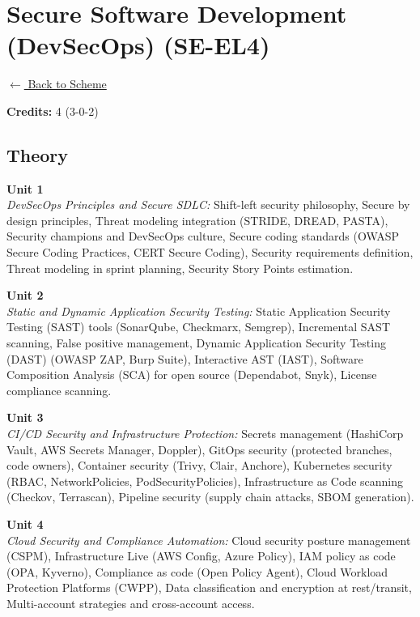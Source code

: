 \section*{Secure Software Development (DevSecOps) (SE-EL4)}
\label{elec:SE_4}

\noindent \small{\hyperref[main:scheme]{$\leftarrow$ Back to Scheme}} \vspace{0.5cm}

\noindent \textbf{Credits:} 4 (3-0-2)

\subsection*{Theory}
\noindent\textbf{Unit 1} \\
\textit{DevSecOps Principles and Secure SDLC:} Shift-left security philosophy, Secure by design principles, Threat modeling integration (STRIDE, DREAD, PASTA), Security champions and DevSecOps culture, Secure coding standards (OWASP Secure Coding Practices, CERT Secure Coding), Security requirements definition, Threat modeling in sprint planning, Security Story Points estimation.

\vspace{0.3cm}

\noindent\textbf{Unit 2} \\
\textit{Static and Dynamic Application Security Testing:} Static Application Security Testing (SAST) tools (SonarQube, Checkmarx, Semgrep), Incremental SAST scanning, False positive management, Dynamic Application Security Testing (DAST) (OWASP ZAP, Burp Suite), Interactive AST (IAST), Software Composition Analysis (SCA) for open source (Dependabot, Snyk), License compliance scanning.

\vspace{0.3cm}

\noindent\textbf{Unit 3} \\
\textit{CI/CD Security and Infrastructure Protection:} Secrets management (HashiCorp Vault, AWS Secrets Manager, Doppler), GitOps security (protected branches, code owners), Container security (Trivy, Clair, Anchore), Kubernetes security (RBAC, NetworkPolicies, PodSecurityPolicies), Infrastructure as Code scanning (Checkov, Terrascan), Pipeline security (supply chain attacks, SBOM generation).

\vspace{0.3cm}

\noindent\textbf{Unit 4} \\
\textit{Cloud Security and Compliance Automation:} Cloud security posture management (CSPM), Infrastructure Live (AWS Config, Azure Policy), IAM policy as code (OPA, Kyverno), Compliance as code (Open Policy Agent), Cloud Workload Protection Platforms (CWPP), Data classification and encryption at rest/transit, Multi-account strategies and cross-account access.


